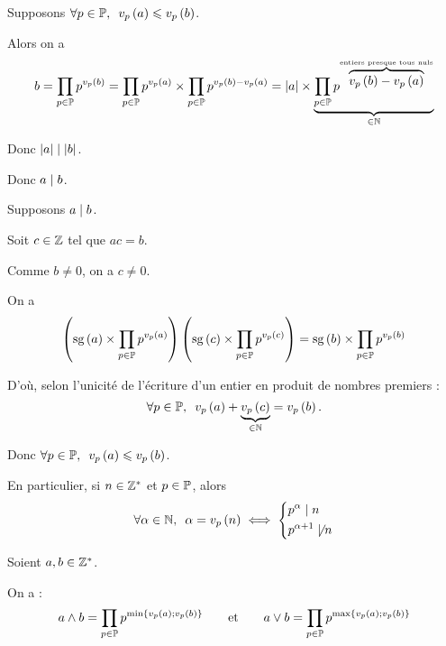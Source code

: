 \begin{dem}
\imprec

Supposons \(\quantifs{\forall p\in\prem}\valp{p}{a}\leq\valp{p}{b}\).

Alors on a \[b=\prod_{p\in\mathbb{P}}p^{v_{p}\left(b\right)}=\prod_{p\in\mathbb{P}}p^{v_{p}\left(a\right)}\times\prod_{p\in\mathbb{P}}p^{v_{p}\left(b\right)-v_{p}\left(a\right)}=\left\lvert a\right\rvert\times\underbrace{\prod_{p\in\mathbb{P}}p^{\overbrace{v_{p}\left(b\right)-v_{p}\left(a\right)}^{\text{entiers presque tous nuls}}}}_{\in\mathbb{N}}\]

Donc \(\left\lvert a\right\rvert\mid\left\lvert b\right\rvert\).

Donc \(a\mid b\).

\imprec

Supposons \(a\mid b\).

Soit \(c\in\mathbb{Z}\) tel que \(ac=b\).

Comme \(b\not=0\), on a \(c\not=0\).

On a \[\left(\operatorname{sg}\left(a\right)\times\prod_{p\in\mathbb{P}}p^{v_{p}\left(a\right)}\right)\left(\operatorname{sg}\left(c\right)\times\prod_{p\in\mathbb{P}}p^{v_{p}\left(c\right)}\right)=\operatorname{sg}\left(b\right)\times\prod_{p\in\mathbb{P}}p^{v_{p}\left(b\right)}\]

D'où, selon l'unicité de l'écriture d'un entier en produit de nombres premiers : \[\quantifs{\forall p\in\prem}\valp{p}{a}+\underbrace{\valp{p}{c}}_{\in\N}=\valp{p}{b}.\]

Donc \(\quantifs{\forall p\in\prem}\valp{p}{a}\leq\valp{p}{b}\).
\end{dem}

\begin{rem}
En particulier, si \(n\in\mathbb{Z}^*\) et \(p\in\mathbb{P}\), alors \[\quantifs{\forall\alpha\in\N}\alpha=\valp{p}{n}\ssi\begin{dcases}p^\alpha\divise n \\ p^{\alpha+1}\not\divise n\end{dcases}\]
\end{rem}

\begin{prop}
Soient \(a,b\in\mathbb{Z}^*\).

On a : \[a\land b=\prod_{p\in\mathbb{P}}p^{\min\left\lbrace v_{p}\left(a\right);v_{p}\left(b\right)\right\rbrace}\qquad\text{et}\qquad a\lor b=\prod_{p\in\mathbb{P}}p^{\max\left\lbrace v_{p}\left(a\right);v_{p}\left(b\right)\right\rbrace}\]
\end{prop}

